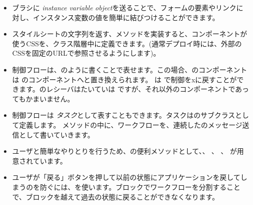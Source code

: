 \documentclass[a4paper,10pt,twoside]{book}
\begin{document}
\begin{itemize}
  \item ブラシに \emph{instance variable}  \emph{object}を送ることで、フォームの要素やリンクに対し、インスタンス変数の値を簡単に結びつけることができます。
  \item スタイルシートの文字列を返す、メソッドを実装すると、コンポーネントが使うCSSを、クラス階層中に定義できます。(通常デプロイ時には、外部のCSSを固定のURLで参照させるようにします)。
  \item 制御フローは、のように書くことで表せます。この場合、のコンポーネントは のコンポーネントへと置き換えられます。  は  で制御をxに戻すことができます。のレシーバはたいていは ですが、それ以外のコンポーネントであってもかまいません。
  \item 制御フローは \emph{タスク}として表すこともできます。タスクはのサブクラスとして定義します。 メソッドの中に、ワークフローを、連続したのメッセージ送信として書いていきます。
  \item ユーザと簡単なやりとりを行うため、の便利メソッドとして、、 、 、 が用意されています。
  \item ユーザが「戻る」ボタンを押して以前の状態にアプリケーションを戻してしまうのを防ぐには、を使います。ブロックでワークフローを分割することで、ブロックを越えて過去の状態に戻ることができなくなります。
\end{itemize}

\ifx\wholebook\relax\else 
   
   
\end{document}
